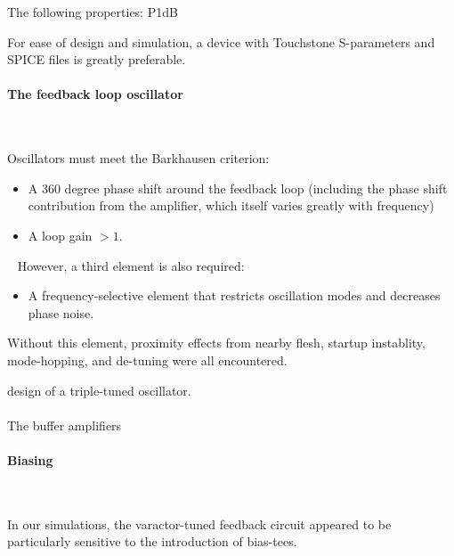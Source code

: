 \documentclass[fleqn,10pt]{article}
\begin{document}
\begin{multicols}{1}

\noindent{}
%
The following properties: P1dB

For ease of design and simulation, a device with Touchstone S-parameters and SPICE files is greatly preferable.
%
\paragraph{\textbf{The feedback loop oscillator}}\

Oscillators must meet the Barkhausen criterion:

\begin{itemize}

\item A 360 degree phase shift around the feedback loop (including the phase shift contribution from the amplifier, which itself varies greatly with frequency)
\item A loop gain $>1.$ 

\end{itemize}\
%
However, a third element is also required:
%
\begin{itemize}
\item A frequency-selective element that restricts oscillation modes and decreases phase noise.
\end{itemize}
%
Without this element, proximity effects from nearby flesh, startup instablity, mode-hopping, and de-tuning were all encountered. 



 design of a triple-tuned oscillator.


\paragraph{}
The buffer amplifiers 

\paragraph{Biasing}\

In our simulations, the varactor-tuned feedback circuit appeared to be particularly sensitive to the introduction of bias-tees. 



\end{multicols}
\end{document}
